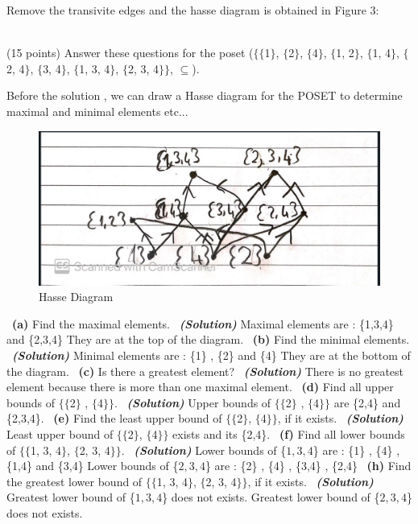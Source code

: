 \documentclass[a4 paper]{article}
\numberwithin{equation}{section}
\newcommand{\problem}[2]{~\\\fbox{\textbf{Problem #1}}\hfill (#2 points)\newline\newline}
\newcommand{\subproblem}[1]{~\newline\textbf{(#1)}}
\newcommand{\solution}{~\newline\textbf{\textit{(Solution)}} }
\newcommand{\0}{\mathbf{0}}
\begin{document}
Remove the transivite edges and the hasse diagram is obtained in Figure 3:


\newpage
\problem{2: Relations}{15}
Answer these questions for the poset ($\{\{$1$\}$, $\{$2$\}$, $\{$4$\}$, $\{$1, 2$\}$, $\{$1, 4$\}$, $\{$2, 4$\}$, $\{$3, 4$\}$, $\{$1, 3, 4$\}$, $\{$2, 3, 4$\}\}$, $\subseteq$).

Before the solution , we can draw a Hasse diagram for the POSET to determine maximal and minimal elements etc...\newline

\begin{figure}[htp]
	\centering
	\includegraphics[scale=0.4]{diagram2.png}
	\caption{Hasse Diagram}
	\label{fig: diagram}
	
\end{figure}

\subproblem{a} Find the maximal elements.
\solution
Maximal elements are : \{1,3,4\} and \{2,3,4\} They are at the top of the diagram.\newline
\subproblem{b} Find the minimal elements.
\solution
Minimal elements are : \{1\} , \{2\} and \{4\} They are at the bottom of the diagram.\newline
\subproblem{c} Is there a greatest element?
\solution
There is no greatest element because there is more than one maximal element.\newline
\subproblem{d} Find all upper bounds of $\{\{$2$\}$ , $\{$4$\}\}$.
\solution
Upper bounds of $\{\{$2$\}$ , $\{$4$\}\}$ are \{2,4\} and \{2,3,4\}.\newline
\subproblem{e} Find the least upper bound of $\{\{$2$\}$, $\{$4$\}\}$, if it exists.
\solution
Least upper bound of $\{\{$2$\}$, $\{$4$\}\}$ exists and its \{2,4\}.\newline
\subproblem{f} Find all lower bounds of $\{\{$1, 3, 4$\}$, $\{$2, 3, 4$\}\}$.
\solution
Lower bounds of \{$1, 3, 4$\} are : \{1\} , \{4\} , \{1,4\} and \{3,4\} \newline
Lower bounds of \{$2, 3, 4$\} are : \{2\} , \{4\} , \{3,4\} , \{2,4\} \newline
\subproblem{h} Find the greatest lower bound of $\{\{$1, 3, 4$\}$, $\{$2, 3, 4$\}\}$, if it exists.
\solution
Greatest lower bound of \{$1, 3, 4$\} does not exists.\newline
Greatest lower bound of \{$2, 3, 4$\} does not exists.\newline
\newpage
\end{document}
